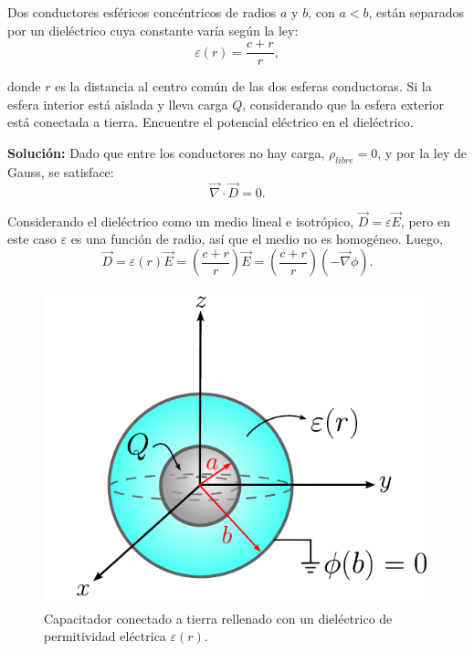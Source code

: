 \begin{ejemplo}
Dos conductores esféricos concéntricos de radios $a$ y $b$, con $a < b$, están separados por un dieléctrico cuya constante varía según la ley:
$$\varepsilon(r) = \frac{c+r}{r},$$

donde $r$ es la distancia al centro común de las dos esferas conductoras. Si la esfera interior está aislada y lleva carga $Q$, considerando que la esfera exterior está conectada a tierra. Encuentre el potencial eléctrico en el dieléctrico.

\textbf{Solución:} Dado que entre los conductores no hay carga, $\rho_{libre} = 0$, y por la ley de Gauss, se satisface:
\begin{equation}
 \Vec{\nabla} \cdot \Vec{D} = 0.   \label{Ej-Laplace-1}
\end{equation}

Considerando el dieléctrico como un medio lineal e isotrópico, $\Vec{D} = \varepsilon \Vec{E}$, pero en este caso $\varepsilon$ es una función de radio, así que el medio no es homogéneo. Luego,
$$\Vec{D} = \varepsilon(r) \Vec{E} = \left( \frac{c+r}{r} \right) \Vec{E} = \left( \frac{c+r}{r} \right) \left( - \Vec{\nabla} \phi\right).$$

\begin{figure}[H]
    \centering
    \includegraphics[scale = 0.8]{Figuras/Ej-Laplace-Dielectric.pdf}
    \caption{Capacitador conectado a tierra rellenado con un dieléctrico de permitividad eléctrica $\varepsilon(r)$.}
    \label{fig:Ej-Laplace-Dielectric}
\end{figure}


\end{ejemplo}
